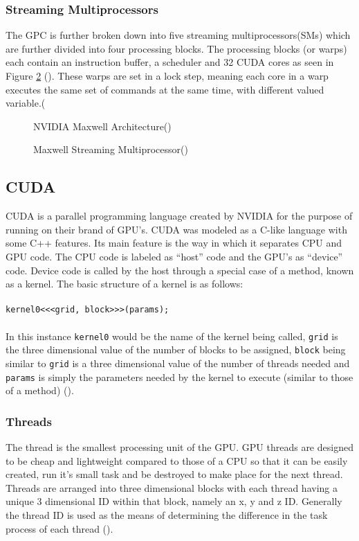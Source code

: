 \subsubsection{Streaming Multiprocessors}\label{gpu:ssec:smm}
The GPC is further broken down into five streaming multiprocessors(SMs) which are further divided into four processing blocks. The processing blocks (or warps) each contain an instruction buffer, a scheduler and 32 CUDA cores as seen in Figure \ref{gpu:img:smm} (\cite{GM107SMM}). These warps are set in a lock step, meaning each core in a warp executes the same set of commands at the same time, with different valued variable.(\cite{CUDA_DEVKIT}
%
\begin{figure}[H]
 \centering
 \caption{NVIDIA Maxwell Architecture(\cite{GM107})}
 \label{gpu:img:gm107}
\end{figure}
%
\begin{figure}[H]
\centering
 \caption{Maxwell Streaming Multiprocessor(\cite{GM107SMM})}
 \label{gpu:img:smm}
\end{figure}
\subsection{CUDA}\label{soft:sec:cuda}
CUDA is a parallel programming language created by NVIDIA for the purpose of running on their brand of GPU's. CUDA was modeled as a C-like language with some C++ features. Its main feature is the way in which it separates CPU and GPU code. The CPU code is labeled as ``host'' code and the GPU's as ``device'' code. Device code is called by the host through a special case of a method, known as a kernel. The basic structure of a kernel is as follows: 
\\
\\
\texttt{kernel0<<<grid, block>>>(params);}
\\
\\
In this instance \texttt{kernel0} would be the name of the kernel being called, \texttt{grid} is the three dimensional value of the number of blocks to be assigned, \texttt{block} being similar to \texttt{grid} is a three dimensional value of the number of threads needed and \texttt{params} is simply the parameters needed by the kernel to execute (similar to those of a method) (\cite{CUDA_DEVKIT}).
%
\subsubsection{Threads}\label{soft:ssec:thread}
The thread is the smallest processing unit of the GPU. GPU threads are designed to be cheap and lightweight compared to those of a CPU so that it can be easily created, run it's small task and be destroyed to make place for the next thread. Threads are arranged into three dimensional blocks with each thread having a unique 3 dimensional ID within that block, namely an x, y and z ID. Generally the thread ID is used as the means of determining the difference in the task process of each thread (\cite{CUDA_DEVKIT}).
%
